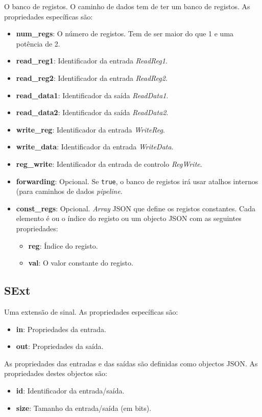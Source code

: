 \documentclass[11pt,a4paper,twoside,titlepage]{report}
\begin{document}
O banco de registos. O caminho de dados tem de ter um banco de registos.
As propriedades específicas são:
\begin{itemize}
	\item \textbf{num\_regs}: O número de registos. Tem de ser maior do que 1 e
		uma potência de 2.
	\item \textbf{read\_reg1}: Identificador da entrada \emph{ReadReg1}.
	\item \textbf{read\_reg2}: Identificador da entrada \emph{ReadReg2}.
	\item \textbf{read\_data1}: Identificador da saída \emph{ReadData1}.
	\item \textbf{read\_data2}: Identificador da saída \emph{ReadData2}.
	\item \textbf{write\_reg}: Identificador da entrada \emph{WriteReg}.
	\item \textbf{write\_data}: Identificador da entrada \emph{WriteData}.
	\item \textbf{reg\_write}: Identificador da entrada de controlo \emph{RegWrite}.
	\item \textbf{forwarding}: Opcional. Se \verb+true+, o banco de registos irá
		usar atalhos internos (para caminhos de dados \emph{pipeline}.
	\item \textbf{const\_regs}: Opcional. \emph{Array} JSON que define os registos
		constantes. Cada elemento é ou o índice do registo ou um objecto JSON com
		as seguintes propriedades:
		\begin{itemize}
			\item \textbf{reg}: Índice do registo.
			\item \textbf{val}: O valor constante do registo.
		\end{itemize}
\end{itemize}

\subsection{SExt}

Uma extensão de sinal. As propriedades específicas são:
\begin{itemize}
	\item \textbf{in}: Propriedades da entrada.
	\item \textbf{out}: Propriedades da saída.
\end{itemize}

As propriedades das entradas e das saídas são definidas como objectos JSON.
As propriedades destes objectos são:
\begin{itemize}
	\item \textbf{id}: Identificador da entrada/saída.
	\item \textbf{size}: Tamanho da entrada/saída (em bits).
\end{itemize}
\end{document}
